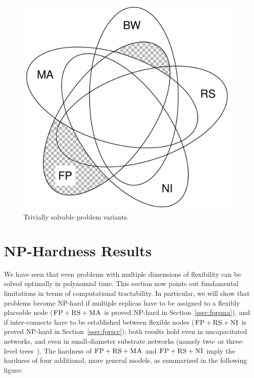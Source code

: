 \documentclass[9pt,twocolumn]{scrartcl}
\newcommand{\carlo}[1]{\textcolor{red}{carlo: #1}}
\newcommand{\CC}{\textsc{NI}}
\newcommand{\FP}{\textsc{FP}}
\newcommand{\RS}{\textsc{RS}}
\newcommand{\MA}{\textsc{MA}}
\begin{document}
\begin{figure}
\includegraphics[width=\columnwidth]{figs/venn_trivial.pdf}
\caption{Trivially solvable problem variants.}
\label{fig:venn_trivial}
\end{figure}


\section{NP-Hardness Results}\label{sec:np}


We have seen that even problems with multiple dimensions of
flexibility can be solved optimally in polynomial time.
This section now points out fundamental
limitations in terms of computational tractability. In particular, we
will show that problems become NP-hard if multiple replicas have to be
assigned to a flexibly placeable node ($\FP+\RS+\MA$ is proved NP-hard in
Section~\ref{ssec:fprsma}), and if inter-connects have to be established
between flexible nodes ($\FP+\RS+\CC$ is proved NP-hard in Section~\ref{ssec:fprscc}); both
results hold even in uncapacitated networks, and even in small-diameter
substrate networks (namely two- or three-level trees~\cite{fattree}).
The hardness of $\FP+\RS+\MA$ and $\FP+\RS+\CC$ imply
the hardness of four additional, more general models, as
summarized in the following figure:
\end{document}
